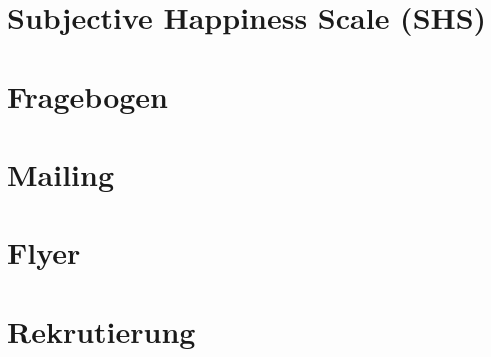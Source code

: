 \section{Subjective Happiness Scale (SHS)}\label{app:SHS}
\newpage

\section{Fragebogen}\label{app:Fragebogen}

\newpage

\section{Mailing}\label{app:Mailing}

\newpage

\section{Flyer}\label{app:Flyer}

\newpage

\section{Rekrutierung}\label{app:Rekrutierung}

\newpage




%
%
%